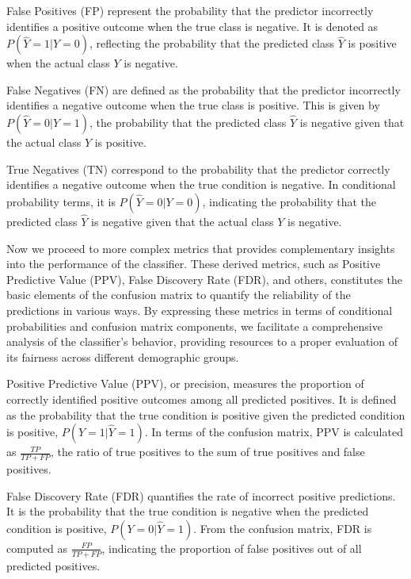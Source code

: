False Positives (FP) represent the probability that the predictor incorrectly identifies a positive outcome when the true class is negative. It is denoted as $P(\hat{Y}=1|Y=0)$, reflecting the probability that the predicted class $\hat{Y}$ is positive when the actual class $Y$ is negative.

False Negatives (FN) are defined as the probability that the predictor incorrectly identifies a negative outcome when the true class is positive. This is given by $P(\hat{Y}=0|Y=1)$, the probability that the predicted class $\hat{Y}$ is negative given that the actual class $Y$ is positive.

True Negatives (TN) correspond to the probability that the predictor correctly identifies a negative outcome when the true condition is negative. In conditional probability terms, it is $P(\hat{Y}=0|Y=0)$, indicating the probability that the predicted class $\hat{Y}$ is negative given that the actual class $Y$ is negative.

Now we proceed to more complex metrics that provides complementary insights into the performance of the classifier. These derived metrics, such as Positive Predictive Value (PPV), False Discovery Rate (FDR), and others, constitutes the basic elements of the confusion matrix to quantify the reliability of the predictions in various ways. By expressing these metrics in terms of conditional probabilities and confusion matrix components, we facilitate a comprehensive analysis of the classifier's behavior, providing resources to a proper evaluation of its fairness across different demographic groups.

\begin{definition}\label{def:ppv}
Positive Predictive Value (PPV), or precision, measures the proportion of correctly identified positive outcomes among all predicted positives. It is defined as the probability that the true condition is positive given the predicted condition is positive, $P(Y=1|\hat{Y}=1)$. In terms of the confusion matrix, PPV is calculated as $\frac{TP}{TP + FP}$, the ratio of true positives to the sum of true positives and false positives.
\end{definition}

\begin{definition}\label{def:fdr}
False Discovery Rate (FDR) quantifies the rate of incorrect positive predictions. It is the probability that the true condition is negative when the predicted condition is positive, $P(Y=0|\hat{Y}=1)$. From the confusion matrix, FDR is computed as $\frac{FP}{TP + FP}$, indicating the proportion of false positives out of all predicted positives.
\end{definition}

